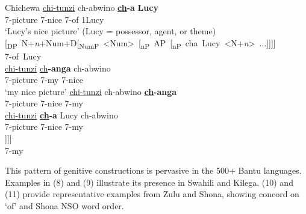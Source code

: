\documentclass[output=paper
,modfonts
,nonflat]{langsci/langscibook}
\begin{document}
\begin{exe}
		\ex  Chichewa \citep[372, 374]{Carstens1997}
		\xlist
		\ex
		\gll \underline{chi}\underline{-tunzi}     ch-abwino     \textbf{\underline{ch}-a}   \textbf{Lucy}\\
		7-picture   7-nice         7-of   1Lucy\\
		\glt `Lucy's nice picture'  (Lucy = possessor, agent, or theme) 	
		\ex 
		\gll \mbox{[\textsubscript{DP} N+\textit{n}+Num+D[\textsubscript{NumP} <Num> [\textsubscript{nP} AP [\textsubscript{nP} cha Lucy <N+\textit{n}> ...]]]]}\\
		\mbox{\hspace{6.7cm}7-of Lucy}\\ 
		\ex {}
		\gll \underline{chi}\underline{-tunzi}      \underline{ch}\textbf{-anga}     ch-abwino\\
		7-picture   7-my         7-nice\\
		\glt `my nice picture'
		\ex
		\gll  *\underline{chi}\underline{-tunzi}    ch-abwino     \textbf{\underline{ch}-anga}\\
		7-picture   7-nice      7-my\\
		\ex
		\gll  *\underline{chi}\underline{-tunzi}    \textbf{\underline{ch}-a} Lucy     ch-abwino\\
		7-picture   7-nice      7-my\\
		\ex \label{ex:7f}
		\gll[\textsubscript{DP} N+n+Num+D [\textsubscript{NumP} changa <Num> [\textsubscript{nP} AP [\textsubscript{nP}  <changa> <N+\textit{n}>...]]]]\\
		{} {} {} 7-my \\
		\endxlist
\end{exe}
This pattern of genitive constructions is pervasive in the 500+ Bantu languages. Examples in (8) and (9) illustrate its presence in Swahili and Kilega. (10) and (11) provide representative examples from Zulu and Shona, showing concord on ‘of’ and Shona NSO word order.
\end{document}
